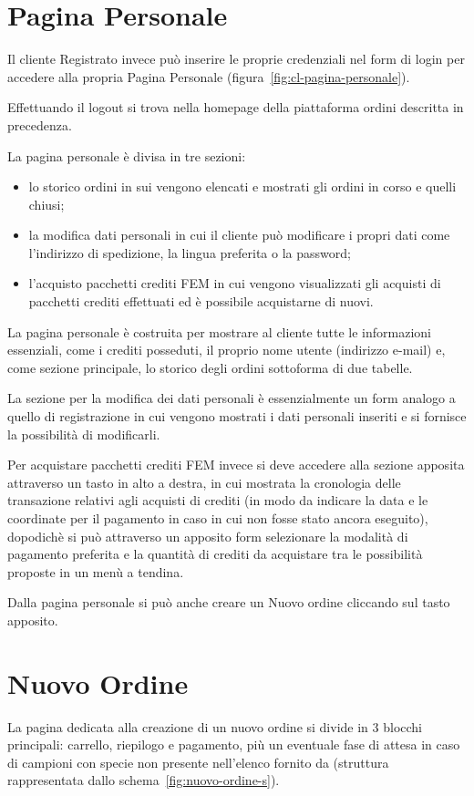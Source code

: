 \section*{Pagina Personale}
Il cliente \textsf{Registrato} invece può inserire le proprie credenziali nel form di login per accedere alla propria \textsf{Pagina Personale} (figura~\ref{fig:cl-pagina-personale}).

Effettuando il \textsf{logout} si trova nella homepage della piattaforma ordini descritta in precedenza.

La pagina personale è divisa in tre sezioni: 
\begin{itemize}
 \item lo \textsf{storico ordini} in sui vengono elencati e mostrati gli ordini in corso e quelli chiusi;
 \item la \textsf{modifica dati personali} in cui il cliente può modificare i propri dati come l'indirizzo di spedizione, la lingua preferita o la password;
 \item l'acquisto \textsf{pacchetti crediti FEM} in cui vengono visualizzati gli acquisti di pacchetti crediti effettuati ed è possibile acquistarne di nuovi.
\end{itemize}

La pagina personale è costruita per mostrare al cliente tutte le informazioni essenziali, come i crediti posseduti, il proprio nome utente (indirizzo e-mail) e, come sezione principale, lo storico degli ordini sottoforma di due tabelle.

La sezione per la modifica dei dati personali è essenzialmente un form analogo a quello di registrazione in cui vengono mostrati i dati personali inseriti e si fornisce la possibilità di modificarli.

Per acquistare pacchetti crediti FEM invece si deve accedere alla sezione apposita attraverso un tasto in alto a destra, in cui mostrata la cronologia delle transazione relativi agli acquisti di crediti (in modo da indicare la data e le coordinate per il pagamento in caso in cui non fosse stato ancora eseguito), dopodichè si può attraverso un apposito form selezionare la modalità di pagamento preferita e la quantità di crediti da acquistare tra le possibilità proposte in un menù a tendina.

Dalla pagina personale si può anche creare un \textsf{Nuovo ordine} cliccando sul tasto apposito.

\section*{Nuovo Ordine}
La pagina dedicata alla creazione di un nuovo ordine si divide in 3 blocchi principali: \textsf{carrello}, \textsf{riepilogo} e \textsf{pagamento}, più un eventuale fase di \textsf{attesa} in caso di campioni con specie non presente nell'elenco fornito da {\fem} (struttura rappresentata dallo schema~\ref{fig:nuovo-ordine-s}).

